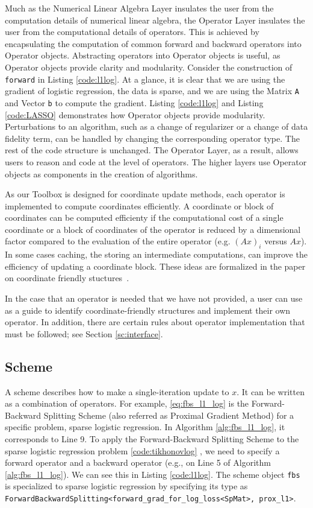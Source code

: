 Much as the Numerical Linear Algebra Layer insulates the user from the computation details of numerical linear algebra, the Operator Layer insulates the user from the computational details of operators. This is achieved by encapsulating the computation of common forward and backward operators into Operator objects. Abstracting operators into Operator objects is useful, as Operator objects provide clarity and modularity. Consider the construction of  \texttt{forward} in Listing \ref{code:l1log}. At a glance, it is clear that we are using the gradient of logistic regression, the data is sparse, and we are using the Matrix \texttt{A} and Vector \texttt{b} to compute the gradient. Listing \ref{code:l1log} and Listing \ref{code:LASSO} demonstrates how Operator objects provide modularity. Perturbations to an algorithm, such as a change of regularizer or a change of data fidelity term, can be handled by changing the corresponding operator type. The rest of the code structure is unchanged. The Operator Layer, as a result, allows users to reason and code at the level of operators. 
The higher layers use Operator objects as components in the creation of algorithms.
 
As our Toolbox is designed for coordinate update methods, each operator is implemented to compute coordinates efficiently.
 A coordinate or block of coordinates can be computed efficienty if the computational cost of a single coordinate or a block of coordinates of the operator is reduced by a dimensional factor compared to the evaluation of the entire operator (e.g. $(Ax)_i$ versus $Ax$). 
 In some cases caching, the storing an intermediate computations, can improve the efficiency of updating a coordinate block. These ideas are formalized in the paper on coordinate friendly stuctures~\citep{PengWuXuYanYin2016_coordinate}.

In the case that an operator is needed that we have not provided, a user can use~\citep{PengWuXuYanYin2016_coordinate} as a guide to identify coordinate-friendly structures and implement their own operator. In addition, there are certain rules about operator implementation that must be followed; see Section \ref{sc:interface}.


\subsection{Scheme}
A scheme describes how to make a single-iteration update to $x$.
It can be written as a combination of operators. For example, \eqref{eq:fbs_l1_log} is the Forward-Backward Splitting Scheme (also referred as Proximal Gradient Method) for a specific problem, sparse logistic regression. In Algorithm \ref{alg:fbs_l1_log}, it corresponds to Line 9. To apply the Forward-Backward Splitting Scheme to the sparse logistic regression problem \ref{code:tikhonovlog} , we need to specify a forward operator and a backward operator (e.g., on Line 5 of Algorithm \ref{alg:fbs_l1_log}). We can see this in Listing \ref{code:l1log}.
The scheme object \texttt{fbs} is specialized to sparse logistic regression by specifying its type as \texttt{ForwardBackwardSplitting<forward\_grad\_for\_log\_loss<SpMat>, prox\_l1>}.

